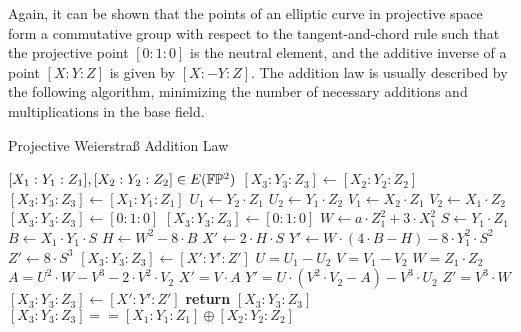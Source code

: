 Again, it can be shown that the points of an elliptic curve in projective space form a commutative group with respect to the tangent-and-chord rule such that the projective point $[0:1:0]$ is the neutral element, and the additive inverse of a point $[X:Y:Z]$ is given by $[X:-Y:Z]$. The addition law is usually described by the following algorithm, minimizing the number of necessary additions and multiplications in the base field. 

\begin{algorithm}\caption{Projective Weierstraß Addition Law}
\begin{algorithmic}[0]
\Require $[X_1:Y_1:Z_1],[X_2:Y_2:Z_2] \in E(\mathbb{F}\mathbb{P}^2)$
\If{$[X_1:Y_1:Z_1] == [0:1:0]$}
  \State $[X_3:Y_3:Z_3] \gets [X_2:Y_2:Z_2]$
\ElsIf{$[X_2:Y_2:Z_2] == [0:1:0]$}
  \State $[X_3:Y_3:Z_3] \gets [X_1:Y_1:Z_1]$
\Else
  \State $U_1 \gets Y_2\cdot Z_1$
  \State $U_2 \gets Y_1\cdot Z_2$
  \State $V_1 \gets X_2\cdot Z_1$
  \State $V_2 \gets X_1\cdot Z_2$
      $[X_3:Y_3:Z_3] \gets [0:1:0]$
    \Else
        $[X_3:Y_3:Z_3] \gets [0:1:0]$
      \Else
        \State $W \gets a\cdot Z_1^2 + 3\cdot X_1^2$
        \State $S \gets Y_1\cdot Z_1$
        \State $B \gets X_1\cdot Y_1\cdot S$
        \State $H \gets W^2 - 8\cdot B$
        \State $X' \gets 2\cdot H\cdot S$
        \State $Y' \gets W\cdot (4\cdot B - H) - 8\cdot Y_1^2\cdot S^2$
        \State $Z' \gets 8\cdot S^3$
        \State $[X_3:Y_3:Z_3] \gets [X':Y':Z']$
      \EndIf
    \EndIf
  \Else
    \State $U = U_1 - U_2$
    \State $V = V_1 - V_2$
    \State $W = Z_1\cdot Z_2$
    \State $A = U^2\cdot W - V^3 - 2\cdot V^2\cdot V_2$
    \State $X' = V\cdot A$
    \State $Y' = U\cdot(V^2\cdot V_2 - A) - V^3\cdot U_2$
    \State $Z' = V^3\cdot W$
    \State $[X_3:Y_3:Z_3]\gets [X':Y':Z']$
  \EndIf
\EndIf
\State \textbf{return} $[X_3:Y_3:Z_3]$
\EndProcedure
\Ensure $ [X_3:Y_3:Z_3] == [X_1:Y_1:Z_1] \oplus [X_2:Y_2:Z_2]$
\end{algorithmic}
\end{algorithm}

